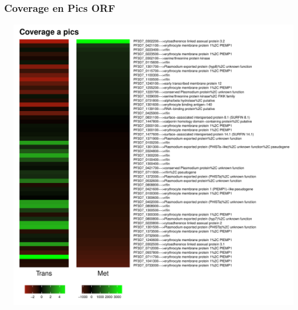 \documentclass{article}\usepackage[]{graphicx}\usepackage[]{color}
\newenvironment{knitrout}{}{} %
\begin{document}
\subsubsection{Coverage en Pics ORF}
\begin{knitrout}
\color{fgcolor}

{\centering \includegraphics[width=20cm,height=12.5cm]{figure/minimal-met_covapics_ORF-1} 

}



\end{knitrout}
\clearpage
\end{document}
